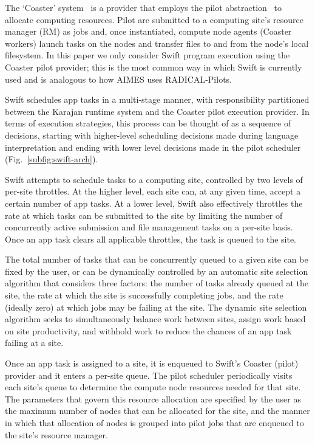 \documentclass[10pt, conference, compsocconf]{IEEEtran}
\begin{document}
The `Coaster' system~\cite{hategan2011coasters} is a provider that employs the
pilot abstraction~\cite{turilli2017comprehensive} to allocate computing
resources. Pilot are submitted to a computing site's resource manager (RM) as
jobs and, once instantiated, compute node agents (Coaster workers) launch tasks
on the nodes and transfer files to and from the node's local filesystem. In this
paper we only consider Swift program execution using the Coaster pilot provider;
this is the most common way in which Swift is currently used and is analogous to
how AIMES uses RADICAL-Pilots.

Swift schedules app tasks in a multi-stage manner, with responsibility
partitioned between the Karajan runtime system and the Coaster pilot
execution provider. In terms of execution strategies, this process can be
thought of as a sequence of decisions, starting with higher-level scheduling
decisions made during language interpretation and ending with lower level
decisions made in the pilot scheduler (Fig.~\ref{subfig:swift-arch}).

Swift attempts to schedule tasks to a computing site, controlled by two
levels of per-site throttles. At the higher level, each site can, at any
given time, accept a certain number of app tasks. At a lower level, Swift
also effectively throttles the rate at which tasks can be submitted to the
site by limiting the number of concurrently active submission and file
management tasks on a per-site basis. Once an app task clears all applicable
throttles, the task is queued to the site.

The total number of tasks that can be concurrently queued to a given site can
be fixed by the user, or can be dynamically controlled by an automatic site
selection algorithm that considers three factors: the number of tasks already
queued at the site, the rate at which the site is successfully completing
jobs, and the rate (ideally zero) at which jobs may be failing at the site.
The dynamic site selection algorithm seeks to simultaneously balance work
between sites, assign work based on site productivity, and withhold work to
reduce the chances of an app task failing at a site.

Once an app task is assigned to a site, it is enqueued to Swift's Coaster
(pilot) provider and it enters a per-site queue. The pilot scheduler
periodically visits each site's queue to determine the compute node resources
needed for that site. The parameters that govern this resource allocation are
specified by the user as the maximum number of nodes that can be allocated
for the site, and the manner in which that allocation of nodes is grouped
into pilot jobs that are enqueued to the site's resource manager.
\end{document}

